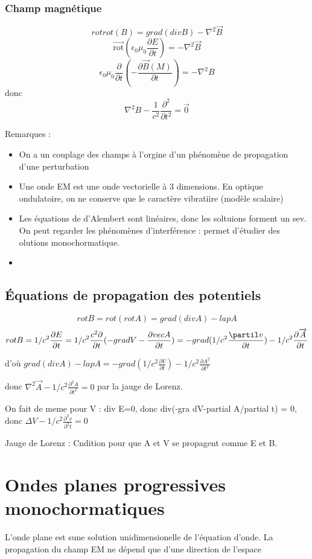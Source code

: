\documentclass[french]{yLectureNote}
\renewcommand{\vec}{\overrightarrow}
\newcommand{\lap}{\nabla^2}
\newcommand{\B}{\vec{B}(M)}
\newcommand{\rot}{\vec{\mathrm{rot}}}
\begin{document}
\subsubsection{Champ magnétique}
$$rot rot(B) = grad (div B) -\lap \vec{B}$$
$$\rot(\epsilon_0\mu_0 \frac{\partial E}{\partial t}) = -\lap \vec{B}$$
$$\epsilon_0\mu_0 \frac{\partial}{\partial t}(-\frac{\partial \B}{\partial t}) = -\lap B$$
donc $$\lap B - \frac{1}{c^2} \frac{\partial^2}{\partial t^2} = \vec{0}$$

Remarques :
\begin{itemize}
    \item On a un couplage des champs à l'orgine d'un phénomène de propagation d'une perturbation
    \item Une onde EM est une onde vectorielle à  3 dimensions. En optique ondulatoire, on ne conserve que le caractère vibratiire (modèle scalaire)
    \item Les équations de d'Alembert sont linéaires, donc les soltuions forment un sev. On peut regarder les phénomènes d'interférence : permet d'étudier des olutions monochormatique.
    \item 
\end{itemize}
\subsection{Équations de propagation des potentiels}
$$rot B = rot (rot A) = grad(div A)-lap A$$
$$rot B =1/c^2 \frac{\partial E}{\partial t} = 1/c^2 \frac{c^2\partial}{\partial t}(-grad V-\frac{\partial vec A}{\partial t}) = -grad (1/c^2 \frac{\partil v}{\partial t})-1/c^2 \frac{\partial \vec{A}}{\partial t}$$

d'où $grad (div A)-lap A  = -grad (1/c^2 \frac{\partial V}{\partial t})-1/c^2 \frac{\partial A^2}{\partial t^2}$

donc $\lap \vec{A} -1/c^2 \frac{\partial^2 A}{\partial t^2} = 0$ par la jauge de Lorenz.

On fait de meme pour V : div E=0, donc div(-gra dV-partial A/partial t) = 0, donc $\Delta V - 1/c^2 \frac{\partial^2 v}{\partial^2 t} = 0$

Jauge de Lorenz : Cndition pour que A et V se propagent comme E et B.

\section{Ondes planes progressives monochormatiques}
L'onde plane est sune solution unidimensionelle de l'équation d'onde. La propagation du champ EM ne dépend que d'une direction de l'espace
\end{document}
